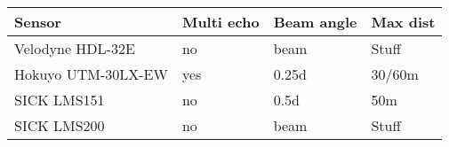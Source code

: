 \begin{table}[htbp]
    \centering
    \begin{tabularx}{\linewidth}{|X||X|X|X|}\hline
        Sensor              & Multi echo & Beam angle & Max dist     \\ \hline%
        Velodyne HDL-32E    & no         & beam       & Stuff        \\ \hline
        Hokuyo UTM-30LX-EW  & yes        & 0.25d      & 30/60m       \\ \hline%
        SICK LMS151         & no         & 0.5d       & 50m          \\ \hline%
        SICK LMS200         & no         & beam       & Stuff        \\ \hline
    \end{tabularx}
\end{table}
